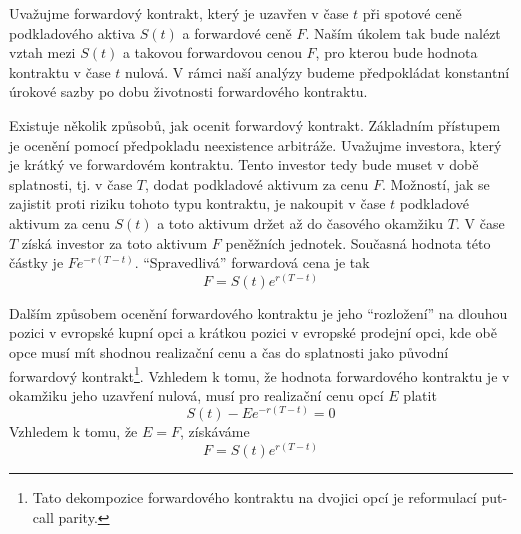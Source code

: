 \documentclass[a4paper]{book}
\begin{document}
Uvažujme forwardový kontrakt, který je uzavřen v čase $t$ při spotové ceně podkladového aktiva $S(t)$ a forwardové ceně $F$. Naším úkolem tak bude nalézt vztah mezi $S(t)$ a takovou forwardovou cenou $F$, pro kterou bude hodnota kontraktu v čase $t$ nulová. V rámci naší analýzy budeme předpokládat konstantní úrokové sazby po dobu životnosti forwardového kontraktu.

Existuje několik způsobů, jak ocenit forwardový kontrakt. Základním přístupem je ocenění pomocí předpokladu neexistence arbitráže. Uvažujme investora, který je krátký ve forwardovém kontraktu. Tento investor tedy bude muset v době splatnosti, tj. v čase $T$, dodat podkladové aktivum za cenu $F$. Možností, jak se zajistit proti riziku tohoto typu kontraktu, je nakoupit v čase $t$ podkladové aktivum za cenu $S(t)$ a toto aktivum držet až do časového okamžiku $T$. V čase $T$ získá investor za toto aktivum $F$ peněžních jednotek. Současná hodnota této částky je $Fe^{-r(T-t)}$. ``Spravedlivá'' forwardová cena je tak
\begin{equation*}
F = S(t)e^{r(T-t)}
\end{equation*}

Dalším způsobem ocenění forwardového kontraktu je jeho ``rozložení'' na dlouhou pozici v evropské kupní opci a krátkou pozici v evropské prodejní opci, kde obě opce musí mít shodnou realizační cenu a čas do splatnosti jako původní forwardový kontrakt\footnote{Tato dekompozice forwardového kontraktu na dvojici opcí je reformulací put-call parity.}. Vzhledem k tomu, že hodnota forwardového kontraktu je v okamžiku jeho uzavření nulová, musí pro realizační cenu opcí $E$ platit
\begin{equation*}
S(t) - Ee^{-r(T-t)} = 0
\end{equation*}
Vzhledem k tomu, že $E = F$, získáváme
\begin{equation*}
F = S(t)e^{r(T-t)}
\end{equation*}
\end{document}
